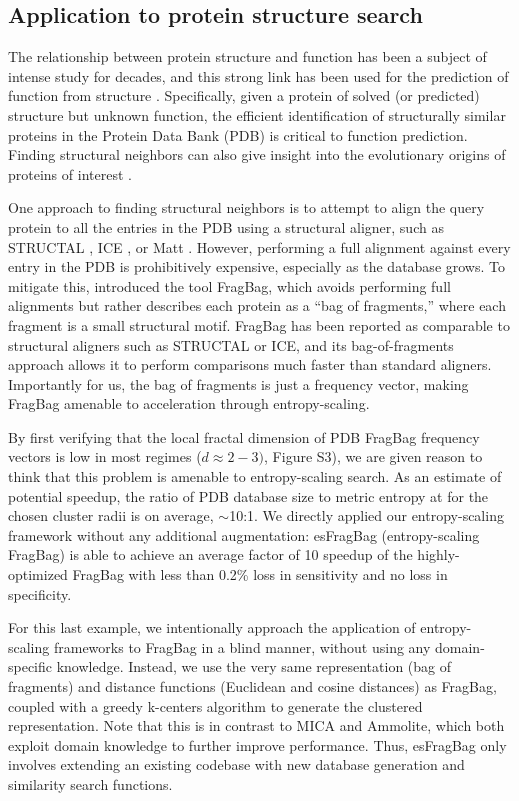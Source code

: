 \documentclass[review,preprint,12pt]{elsarticle}
\renewcommand{\cite}{\citep} %
\theoremstyle{definition}
\theoremstyle{remark}
\numberwithin{equation}{section}
\begin{document}
\subsection{Application to protein structure search}

The relationship between protein structure and function has been a subject of intense study for decades,
and this strong link has been used for the prediction of function from structure \cite{hegyi1999relationship}.
Specifically, given a protein of solved (or predicted) structure but unknown function, the efficient identification
of structurally similar proteins in the Protein Data Bank (PDB) is critical to function prediction.
Finding structural neighbors can also give insight into the evolutionary origins of proteins of interest \cite{yona1999protomap,nepomnyachiy2014global}.

One approach to finding structural neighbors is to attempt to align the query protein to all the entries in the PDB using a structural aligner, such as 
STRUCTAL \cite{subbiah1993structural}, ICE \cite{shindyalov1998protein}, or 
Matt \cite{menke2008matt}.
However, performing a full alignment against every entry in the PDB is prohibitively expensive, especially as the database grows.
To mitigate this, \citep{budowski2010fragbag} introduced the tool FragBag, which avoids performing full alignments but rather describes each protein as a
``bag of fragments,'' where each fragment is a small structural motif.
FragBag has been reported as comparable to structural aligners such as STRUCTAL or ICE,
and its bag-of-fragments approach
allows it to perform comparisons much faster than standard aligners.
Importantly for us, the bag of fragments is just a frequency vector, making
FragBag amenable to acceleration through entropy-scaling.

By first verifying that the local fractal dimension of PDB FragBag frequency vectors is low in most regimes ($d \approx 2-3)$, Figure S3), we are given reason to think that this problem is amenable to entropy-scaling search.
As an estimate of potential speedup, the ratio of PDB database size to metric 
entropy at for the chosen cluster radii is on average, $\sim$10:1.
We directly applied our entropy-scaling framework without any additional 
augmentation: esFragBag (entropy-scaling FragBag) is able to achieve an average
factor of 10 speedup of the highly-optimized FragBag with less than 0.2\% loss 
in sensitivity and no loss in specificity.

For this last example, we intentionally approach the application of entropy-scaling frameworks to FragBag in a blind manner,
without using any domain-specific knowledge.
Instead, we use the very same representation (bag of fragments) and distance functions (Euclidean and cosine distances)
as FragBag, coupled with a greedy k-centers algorithm to generate the clustered representation.
Note that this is in contrast to MICA and Ammolite, which both exploit domain knowledge to further improve performance.
Thus, esFragBag only involves extending an existing codebase with new database generation and similarity search functions.
\end{document}
